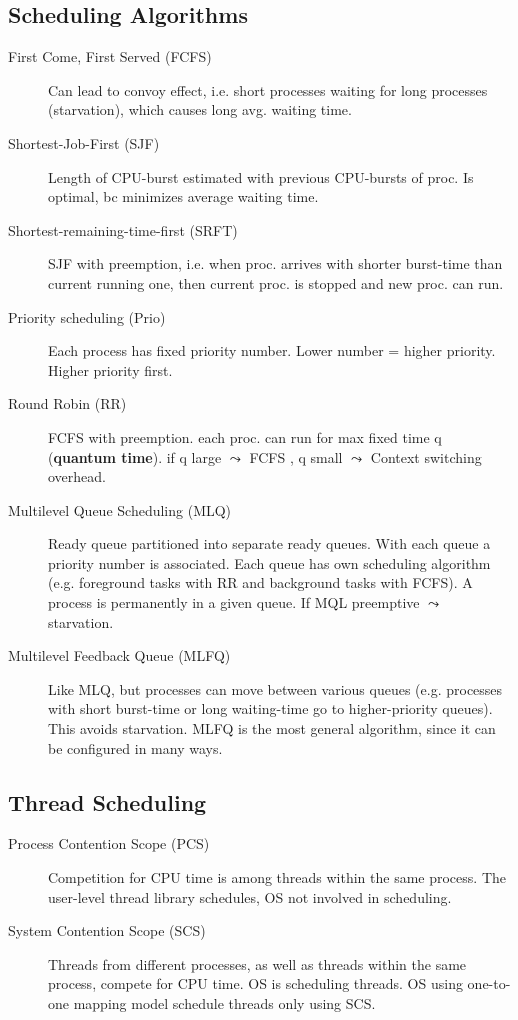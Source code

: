 \subsection*{Scheduling Algorithms}
\begin{description}
  \item[First Come, First Served (FCFS)] Can lead to convoy effect, i.e. short processes waiting for long processes (starvation), which causes long avg. waiting time.
  \item[Shortest-Job-First (SJF)] Length of CPU-burst estimated with previous CPU-bursts of proc. Is optimal, bc minimizes average waiting time.
  \item[Shortest-remaining-time-first (SRFT)] SJF with preemption, i.e. when proc. arrives with shorter burst-time than current running one, then current proc. is stopped and new proc. can run.
  \item[Priority scheduling (Prio)] Each process has fixed priority number. Lower number = higher priority. Higher priority first.
  \item[Round Robin (RR)] FCFS with preemption. each proc. can run for max fixed time q (\textbf{quantum time}). if q large $\leadsto$ FCFS , q small $\leadsto$ Context switching overhead.
  \item[Multilevel Queue Scheduling (MLQ)] Ready queue partitioned into separate ready queues. With each queue a priority number is associated. Each queue has own scheduling algorithm (e.g. foreground tasks with RR and background tasks with FCFS). A process is permanently in a given queue. If MQL preemptive $\leadsto$ starvation.
  \item[Multilevel Feedback Queue (MLFQ)] Like MLQ, but processes can move between various queues (e.g. processes with short burst-time or long waiting-time go to higher-priority queues). This avoids starvation. MLFQ is the most general algorithm, since it can be configured in many ways.
\end{description}

\subsection*{Thread Scheduling}
\begin{description}
  \item[Process Contention Scope (PCS)] Competition for CPU time is  among threads within the same process. The user-level thread library schedules, OS not involved in scheduling.
  \item[System Contention Scope (SCS)] Threads from different processes, as well as threads within the same process, compete for CPU time. OS is scheduling threads. OS using one-to-one mapping model schedule threads only using SCS.
\end{description}
